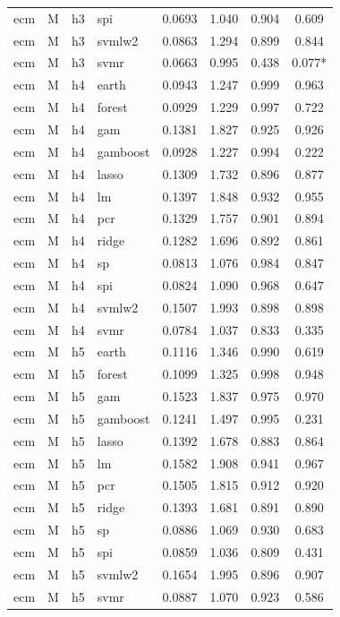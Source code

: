 \begin{ThreePartTable}
\begin{longtable}[t]{llclcccc}
ecm & M & h3 & spi & 0.0693 & 1.040 & 0.904 & 0.609\\
ecm & M & h3 & svmlw2 & 0.0863 & 1.294 & 0.899 & 0.844\\
ecm & M & h3 & svmr & 0.0663 & 0.995 & 0.438 & 0.077*\\
\addlinespace
ecm & M & h4 & earth & 0.0943 & 1.247 & 0.999 & 0.963\\
ecm & M & h4 & forest & 0.0929 & 1.229 & 0.997 & 0.722\\
ecm & M & h4 & gam & 0.1381 & 1.827 & 0.925 & 0.926\\
ecm & M & h4 & gamboost & 0.0928 & 1.227 & 0.994 & 0.222\\
ecm & M & h4 & lasso & 0.1309 & 1.732 & 0.896 & 0.877\\
ecm & M & h4 & lm & 0.1397 & 1.848 & 0.932 & 0.955\\
ecm & M & h4 & pcr & 0.1329 & 1.757 & 0.901 & 0.894\\
ecm & M & h4 & ridge & 0.1282 & 1.696 & 0.892 & 0.861\\
ecm & M & h4 & sp & 0.0813 & 1.076 & 0.984 & 0.847\\
ecm & M & h4 & spi & 0.0824 & 1.090 & 0.968 & 0.647\\
ecm & M & h4 & svmlw2 & 0.1507 & 1.993 & 0.898 & 0.898\\
ecm & M & h4 & svmr & 0.0784 & 1.037 & 0.833 & 0.335\\
\addlinespace
ecm & M & h5 & earth & 0.1116 & 1.346 & 0.990 & 0.619\\
ecm & M & h5 & forest & 0.1099 & 1.325 & 0.998 & 0.948\\
ecm & M & h5 & gam & 0.1523 & 1.837 & 0.975 & 0.970\\
ecm & M & h5 & gamboost & 0.1241 & 1.497 & 0.995 & 0.231\\
ecm & M & h5 & lasso & 0.1392 & 1.678 & 0.883 & 0.864\\
ecm & M & h5 & lm & 0.1582 & 1.908 & 0.941 & 0.967\\
ecm & M & h5 & pcr & 0.1505 & 1.815 & 0.912 & 0.920\\
ecm & M & h5 & ridge & 0.1393 & 1.681 & 0.891 & 0.890\\
ecm & M & h5 & sp & 0.0886 & 1.069 & 0.930 & 0.683\\
ecm & M & h5 & spi & 0.0859 & 1.036 & 0.809 & 0.431\\
ecm & M & h5 & svmlw2 & 0.1654 & 1.995 & 0.896 & 0.907\\
ecm & M & h5 & svmr & 0.0887 & 1.070 & 0.923 & 0.586\\

\end{longtable}
\end{ThreePartTable}
